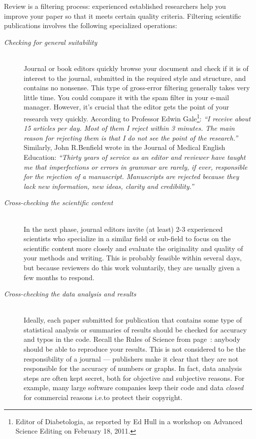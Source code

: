 \documentclass[graybox,envcountchap,sectrefs,UStrade]{svmono}
\begin{document}
Review is a filtering process: experienced established researchers help you improve your paper so that it meets certain quality criteria. Filtering scientific publications involves the following specialized operations:\label{page:filtering articles}

\begin{description}
  \item[\emph{Checking for general suitability}] \hfill \\
  Journal or book editors quickly browse your document and check if it is of interest to the journal, submitted in the required style and structure, and contains no nonsense. This type of gross-error filtering generally takes very little time. You could compare it with the spam filter in your e-mail manager. However, it's crucial that the editor gets the point of your research very quickly. According to Professor Edwin Gale\footnote{Editor of Diabetologia, as reported by Ed Hull in a workshop on Advanced Science Editing on February 18, 2011.}: \emph{``I receive about 15 articles per day. Most of them I reject within 3 minutes. The main reason for rejecting them is that I do not see the point of the research.''} Similarly, John R.\@ Benfield wrote in the Journal of Medical English Education: \emph{``Thirty years of service as an editor and reviewer have taught me that imperfections or errors in grammar are rarely, if ever, responsible for the rejection of a manuscript. Manuscripts are rejected because they lack new information, new ideas, clarity and credibility.''} \medskip
  \item[\emph{Cross-checking the scientific content}] \hfill \\
  In the next phase, journal editors invite (at least) 2-3 experienced scientists who specialize in a similar field or sub-field to focus on the scientific content more closely and evaluate the originality and quality of your methods and writing. This is probably feasible within several days, but because reviewers do this work voluntarily, they are usually given a few months to respond. \medskip
  \item[\emph{Cross-checking the data analysis and results}] \hfill \\
   Ideally, each paper submitted for publication that contains some type of statistical analysis or summaries of results should be checked for accuracy and typos in the code. Recall the Rules of Science from page~\pageref{F:rules}: anybody should be able to reproduce your results. This is not considered to be the responsibility of a journal --- publishers make it clear that they are not responsible for the accuracy of numbers or graphs. In fact, data analysis steps are often kept secret, both for objective and subjective reasons. For example, many large software companies keep their code and data \emph{closed} for commercial reasons i.e.\@ to protect their copyright. \medskip

\end{description}
\end{document}
